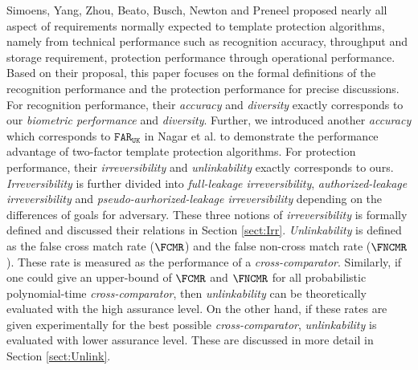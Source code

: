 Simoens, Yang, Zhou, Beato, Busch, Newton and Preneel\cite{SYZBBNP2012} proposed nearly all aspect of requirements normally expected to template protection algorithms, namely from technical performance such as recognition accuracy, throughput and storage requirement, protection performance through operational performance. Based on their proposal,  this paper focuses on the formal definitions of the recognition performance and the protection performance for precise discussions. For recognition performance,  their {\it accuracy}\cite{SYZBBNP2012} and {\it diversity}\cite{SYZBBNP2012} exactly corresponds to our {\it biometric performance} and {\it diversity}. Further, we introduced another {\it accuracy} which corresponds to $\mathtt{FAR}_\mathtt{UK}$ in Nagar et al.\cite{Nagar:2010tg} to demonstrate the performance advantage of two-factor template protection algorithms. For protection performance, their {\it irreversibility}\cite{SYZBBNP2012}  and {\it unlinkability}\cite{SYZBBNP2012} exactly corresponds to ours. {\it Irreversibility}\cite{SYZBBNP2012}  is further divided into {\it full-leakage irreversibility}, {\it authorized-leakage irreversibility} and {\it pseudo-aurhorized-leakage irreversibility} depending on the differences of goals for adversary. These three notions of {\it irreversibility} is formally defined and discussed their relations in Section \ref{sect:Irr}. {\it Unlinkability}\cite{SYZBBNP2012} is defined as the false cross match rate ($\FCMR$) and the false non-cross match rate ($\FNCMR$). These rate is measured as the performance of a {\it cross-comparator}. Similarly, if one could give an upper-bound of $\FCMR$ and $\FNCMR$ for all probabilistic polynomial-time  {\it cross-comparator}, then {\it unlinkability} can be theoretically evaluated with the high assurance level. On the other hand, if these rates are given experimentally for the best possible  {\it cross-comparator},  {\it unlinkability} is evaluated with lower assurance level. These are discussed in more detail in Section \ref{sect:Unlink}.
